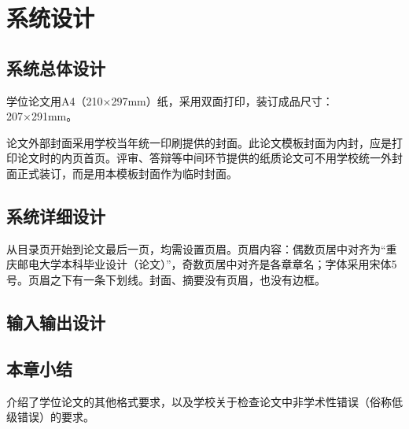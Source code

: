 \chapter{系统设计}

\section{系统总体设计}

学位论文用A4（210×297mm）纸，采用双面打印，装订成品尺寸：207×291mm。

论文外部封面采用学校当年统一印刷提供的封面。此论文模板封面为内封，应是打印论文时的内页首页。评审、答辩等中间环节提供的纸质论文可不用学校统一外封面正式装订，而是用本模板封面作为临时封面。

\section{系统详细设计}

从目录页开始到论文最后一页，均需设置页眉。页眉内容：偶数页居中对齐为“重庆邮电大学本科毕业设计（论文）”，奇数页居中对齐是各章章名；字体采用宋体5号。页眉之下有一条下划线。封面、摘要没有页眉，也没有边框。


\section{输入输出设计}


\section{本章小结}
介绍了学位论文的其他格式要求，以及学校关于检查论文中非学术性错误（俗称低级错误）的要求。








